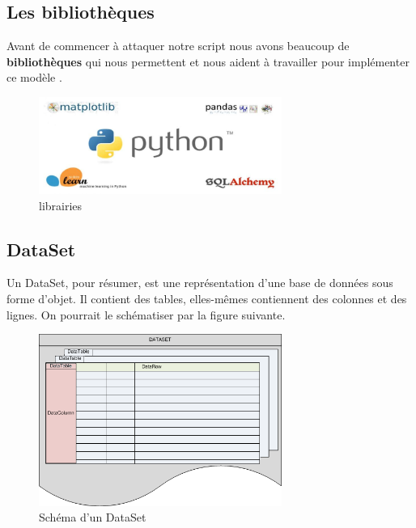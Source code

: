 \documentclass[12pt]{report}
\begin{document}
\subsection{Les bibliothèques}
Avant de commencer à attaquer notre script nous avons beaucoup de  \textbf{bibliothèques}  qui nous permettent et nous aident à travailler pour implémenter ce modèle .
\begin{figure}[h]
\begin{center}
\includegraphics[width=300]{ghg.jpg}
\caption{librairies}
\end{center}
\end{figure}

\newpage
\subsection{DataSet}
Un DataSet, pour résumer, est une représentation d'une base de données sous forme d'objet. Il contient des tables, elles-mêmes contiennent des colonnes et des lignes. On pourrait le schématiser par la figure suivante.
\begin{figure}[h]
\begin{center}
\includegraphics[width=300]{dataSet.png}
\caption{Schéma d'un DataSet}

\end{center}

\end{figure}
\end{document}
